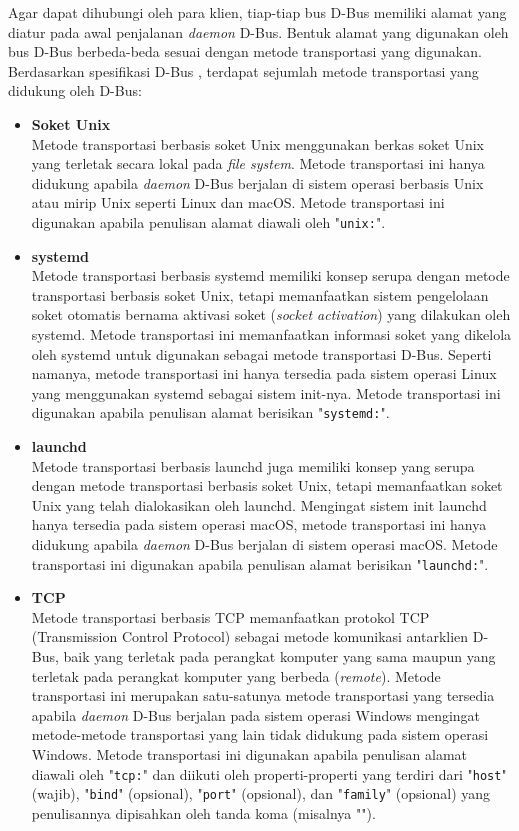 Agar dapat dihubungi oleh para klien, tiap-tiap bus D-Bus memiliki alamat yang diatur pada awal penjalanan \textit{daemon} D-Bus. Bentuk alamat yang digunakan oleh bus D-Bus berbeda-beda sesuai dengan metode transportasi yang digunakan. Berdasarkan spesifikasi D-Bus \cite{dbus-specification}, terdapat sejumlah metode transportasi yang didukung oleh D-Bus:
\begin{itemize}
    \item \textbf{Soket Unix}\\
    Metode transportasi berbasis soket Unix menggunakan berkas soket Unix yang terletak secara lokal pada \textit{file system}. Metode transportasi ini hanya didukung apabila \textit{daemon} D-Bus berjalan di sistem operasi berbasis Unix atau mirip Unix seperti Linux dan macOS. Metode transportasi ini digunakan apabila penulisan alamat diawali oleh "\verb|unix:|".

    \item \textbf{systemd}\\
    Metode transportasi berbasis systemd memiliki konsep serupa dengan metode transportasi berbasis soket Unix, tetapi memanfaatkan sistem pengelolaan soket otomatis bernama aktivasi soket (\textit{socket activation}) yang dilakukan oleh systemd. Metode transportasi ini memanfaatkan informasi soket yang dikelola oleh systemd untuk digunakan sebagai metode transportasi D-Bus. Seperti namanya, metode transportasi ini hanya tersedia pada sistem operasi Linux yang menggunakan systemd sebagai sistem init-nya. Metode transportasi ini digunakan apabila penulisan alamat berisikan "\verb|systemd:|".
    
    \item \textbf{launchd}\\
    Metode transportasi berbasis launchd juga memiliki konsep yang serupa dengan metode transportasi berbasis soket Unix, tetapi memanfaatkan soket Unix yang telah dialokasikan oleh launchd. Mengingat sistem init launchd hanya tersedia pada sistem operasi macOS, metode transportasi ini hanya didukung apabila \textit{daemon} D-Bus berjalan di sistem operasi macOS. Metode transportasi ini digunakan apabila penulisan alamat berisikan "\verb|launchd:|".
    
    \item \textbf{TCP}\\
    Metode transportasi berbasis TCP memanfaatkan protokol TCP (Transmission Control Protocol) sebagai metode komunikasi antarklien D-Bus, baik yang terletak pada perangkat komputer yang sama maupun yang terletak pada perangkat komputer yang berbeda (\textit{remote}). Metode transportasi ini merupakan satu-satunya metode transportasi yang tersedia apabila \textit{daemon} D-Bus berjalan pada sistem operasi Windows mengingat metode-metode transportasi yang lain tidak didukung pada sistem operasi Windows. Metode transportasi ini digunakan apabila penulisan alamat diawali oleh "\verb|tcp:|" dan diikuti oleh properti-properti yang terdiri dari "\verb|host|" (wajib), "\verb|bind|" (opsional), "\verb|port|" (opsional), dan "\verb|family|" (opsional) yang penulisannya dipisahkan oleh tanda koma (misalnya "").


\end{itemize}
